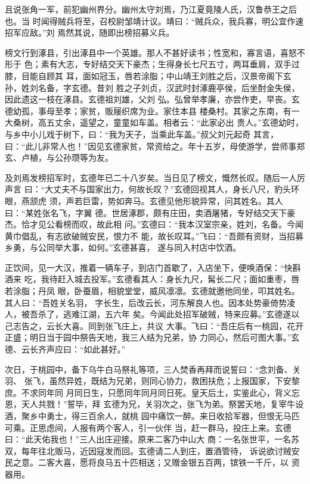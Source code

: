 且说张角一军，前犯幽州界分。幽州太守刘焉，乃江夏竟陵人氏，汉鲁恭王之后也。当
时闻得贼兵将至，召校尉邹靖计议。靖曰：“贼兵众，我兵寡，明公宜作速招军应敌。”刘
焉然其说，随即出榜招募义兵。

榜文行到涿县，引出涿县中一个英雄。那人不甚好读书；性宽和，寡言语，喜怒不形于
色；素有大志，专好结交天下豪杰；生得身长七尺五寸，两耳垂肩，双手过膝，目能自顾其
耳，面如冠玉，唇若涂脂；中山靖王刘胜之后，汉景帝阁下玄孙，姓刘名备，字玄德。昔刘
胜之子刘贞，汉武时封涿鹿亭侯，后坐酎金失侯，因此遗这一枝在涿县。玄德祖刘雄，父刘
弘。弘曾举孝廉，亦尝作吏，早丧。玄德幼孤，事母至孝；家贫，贩屦织席为业。家住本县
楼桑村。其家之东南，有一大桑树，高五丈余，遥望之，童童如车盖。相者云：“此家必出
贵人。”玄德幼时，与乡中小儿戏于树下，曰：“我为天子，当乘此车盖。”叔父刘元起奇
其言，曰：“此儿非常人也！”因见玄德家贫，常资给之。年十五岁，母使游学，尝师事郑
玄、卢植，与公孙瓒等为友。

及刘焉发榜招军时，玄德年已二十八岁矣。当日见了榜文，慨然长叹。随后一人厉声言
曰：“大丈夫不与国家出力，何故长叹？”玄德回视其人，身长八尺，豹头环眼，燕颔虎
须，声若巨雷，势如奔马。玄德见他形貌异常，问其姓名。其人曰：“某姓张名飞，字翼
德。世居涿郡，颇有庄田，卖酒屠猪，专好结交天下豪杰。恰才见公看榜而叹，故此相
问。”玄德曰：“我本汉室宗亲，姓刘，名备。今闻黄巾倡乱，有志欲破贼安民，恨力不
能，故长叹耳。”飞曰：“吾颇有资财，当招募乡勇，与公同举大事，如何。”玄德甚喜，
遂与同入村店中饮酒。

正饮间，见一大汉，推着一辆车子，到店门首歇了，入店坐下，便唤酒保：“快斟酒来
吃，我待赶入城去投军。”玄德看其人：身长九尺，髯长二尺；面如重枣，唇若涂脂；丹凤
眼，卧蚕眉，相貌堂堂，威风凛凛。玄德就邀他同坐，叩其姓名。其人曰：“吾姓关名羽，
字长生，后改云长，河东解良人也。因本处势豪倚势凌人，被吾杀了，逃难江湖，五六年
矣。今闻此处招军破贼，特来应募。”玄德遂以己志告之，云长大喜。同到张飞庄上，共议
大事。飞曰：“吾庄后有一桃园，花开正盛；明日当于园中祭告天地，我三人结为兄弟，协
力同心，然后可图大事。”玄德、云长齐声应曰：“如此甚好。”

次日，于桃园中，备下乌牛白马祭礼等项，三人焚香再拜而说誓曰：“念刘备、关羽、
张飞，虽然异姓，既结为兄弟，则同心协力，救困扶危；上报国家，下安黎庶。不求同年同
月同日生，只愿同年同月同日死。皇天后土，实鉴此心，背义忘恩，天人共戮！”誓毕，拜
玄德为兄，关羽次之，张飞为弟。祭罢天地，复宰牛设酒，聚乡中勇士，得三百余人，就桃
园中痛饮一醉。来日收拾军器，但恨无马匹可乘。正思虑间，人报有两个客人，引一伙伴
当，赶一群马，投庄上来。玄德曰：“此天佑我也！”三人出庄迎接。原来二客乃中山大
商：一名张世平，一名苏双，每年往北贩马，近因寇发而回。玄德请二人到庄，置酒管待，
诉说欲讨贼安民之意。二客大喜，愿将良马五十匹相送；又赠金银五百两，镔铁一千斤，以
资器用。

